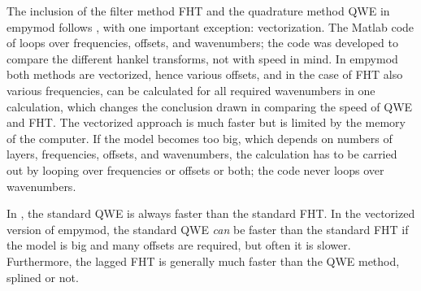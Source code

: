 \documentclass[paper]{geophysics}
\begin{document}
The inclusion of the filter method FHT and the quadrature method QWE in empymod
follows \cite{GEO.12.Key}, with one important exception: vectorization. The
Matlab code of \cite{GEO.12.Key} loops over frequencies, offsets, and
wavenumbers; the code was developed to compare the different hankel transforms,
not with speed in mind. In empymod both methods are vectorized, hence various
offsets, and in the case of FHT also various frequencies, can be calculated for
all required wavenumbers in one calculation, which changes the conclusion drawn
in \cite{GEO.12.Key} comparing the speed of QWE and FHT. The vectorized
approach is much faster but is limited by the memory of the computer. If the
model becomes too big, which depends on numbers of layers, frequencies,
offsets, and wavenumbers, the calculation has to be carried out by looping over
frequencies or offsets or both; the code never loops over wavenumbers.

In \cite{GEO.12.Key}, the standard QWE is always faster than the standard FHT.
In the vectorized version of empymod, the standard QWE \emph{can} be faster
than the standard FHT if the model is big and many offsets are required, but
often it is slower. Furthermore, the lagged FHT is generally much faster than
the QWE method, splined or not.
\end{document}
